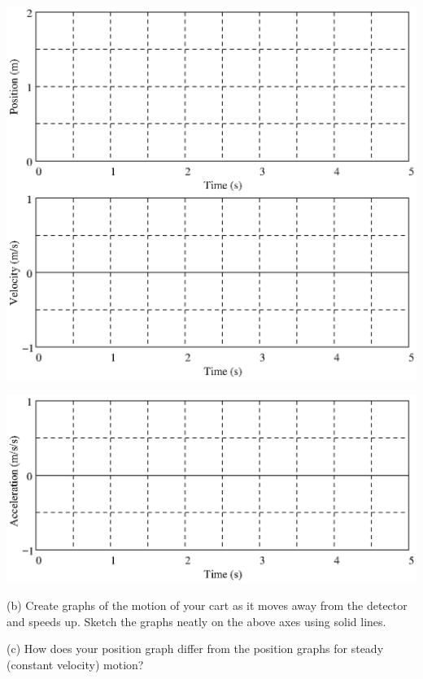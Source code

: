 \vspace{-0.2cm}
{\par\centering \includegraphics[scale=0.93]{changing/changing_fig1.eps} \par}

\vspace{-0.4cm}
{\par\centering \includegraphics[scale=0.93,trim={0 0 0 0.4cm},clip]{changing/changing_fig2.eps} \par}

(b) Create graphs of the motion of your cart as it moves away from the detector
and speeds up. Sketch the graphs neatly on the above axes using solid lines.

\pagebreak[2]
(c) How does your position graph differ from the position graphs for steady
(constant velocity) motion? 
\vspace{13mm}


